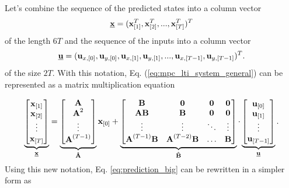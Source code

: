 \documentclass[a4paper,11pt,titlepage]{article}
\newcommand{\uvec}{\textbf{\underline{u}}}
\begin{document}
Let's combine the sequence of the predicted states into a column vector
\begin{equation}
\textbf{\underline{x}} = (\textbf{x}_{[1]}^T, \textbf{x}_{[2]}^T, ..., \textbf{x}_{[T]}^T)^T
\end{equation}
of the length $6T$ and the sequence of the inputs into a column vector
\begin{equation}
\uvec = (\textbf{u}_{x,[0]}, \textbf{u}_{y,[0]}, \textbf{u}_{x,[1]}, \textbf{u}_{y,[1]}, ..., \textbf{u}_{x,[T-1]}, \textbf{u}_{y,[T-1]})^T.
\end{equation}
of the size $2T$. With this notation, Eq. (\ref{eq:mpc_lti_system_general}) can be represented as a matrix multiplication equation

\begin{equation}
\label{eq:prediction_big}
\underbrace{
\begin{bmatrix}
\textbf{x}_{[1]} \\
\textbf{x}_{[2]} \\
\vdots \\
\textbf{x}_{[T]} \\
\end{bmatrix}}_{\textbf{\underline{x}}}
=
\underbrace{
\begin{bmatrix}
\textbf{A} \\
\textbf{A}^2 \\
\vdots \\
\textbf{A}^{(T-1)} \\
\end{bmatrix}}_{\textbf{\^A}}
\textbf{x}_{[0]}
+
\underbrace{
\begin{bmatrix}
\textbf{B} & \textbf{0} & \textbf{0} & \textbf{0} \\
\textbf{AB} & \textbf{B} & \textbf{0} & \textbf{0} \\
\vdots & \vdots & \ddots & \vdots \\
\textbf{A}^{(T-1)}\textbf{B} & \textbf{A}^{(T-2)}\textbf{B} & \hdots & \textbf{B}
\end{bmatrix}
}_{\textbf{\^B}}
\cdot
\underbrace{
\begin{bmatrix}
\textbf{u}_{[0]} \\
\textbf{u}_{[1]} \\
\vdots \\
\textbf{u}_{[T-1]} \\
\end{bmatrix}}_{\uvec}.
\end{equation}
Using this new notation, Eq. \ref{eq:prediction_big} can be rewritten in a simpler form as
\end{document}

